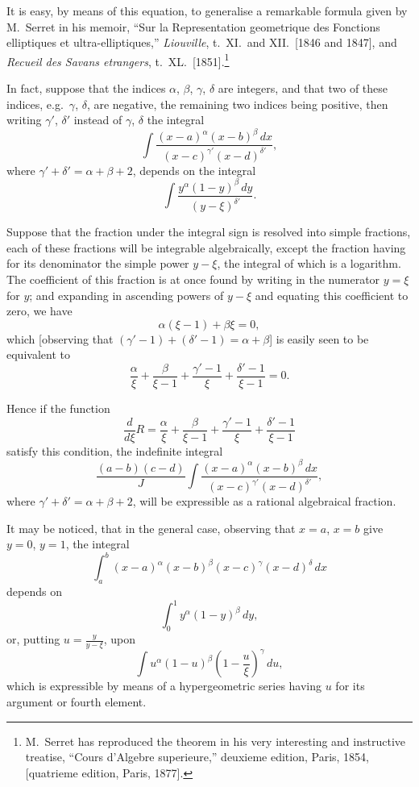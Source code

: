 \documentclass[12pt,a4paper]{article}
\theoremstyle{plain}
\begin{document}
It is easy, by means of this equation, to generalise a remarkable formula given by M.~Serret in his memoir, ``Sur la Representation geometrique des Fonctions elliptiques et ultra-elliptiques,'' \textit{Liouville}, t.~XI.\ and XII.\ [1846 and 1847], and \textit{Recueil des Savans etrangers}, t.~XL.\ [1851].\footnote{M.~Serret has reproduced the theorem in his very interesting and instructive treatise, ``Cours d'Algebre superieure,'' deuxieme edition, Paris, 1854, [quatrieme edition, Paris, 1877].}

In fact, suppose that the indices $\alpha$, $\beta$, $\gamma$, $\delta$ are integers, and that two of these indices, e.g.\ $\gamma$, $\delta$, are negative, the remaining two indices being positive, then writing $\gamma'$, $\delta'$ instead of $\gamma$, $\delta$ the integral
\[
\int \frac{(x-a)^\alpha (x-b)^\beta \, dx}{(x-c)^{\gamma'} (x-d)^{\delta'}},
\]
where $\gamma' + \delta' = \alpha + \beta + 2$, depends on the integral
\[
\int \frac{y^\alpha (1-y)^\beta \, dy}{(y-\xi)^{\delta'}}.
\]

Suppose that the fraction under the integral sign is resolved into simple fractions, each of these fractions will be integrable algebraically, except the fraction having for its denominator the simple power $y-\xi$, the integral of which is a logarithm. The coefficient of this fraction is at once found by writing in the numerator $y = \xi$ for $y$; and expanding in ascending powers of $y-\xi$ and equating this coefficient to zero, we have
\[
\alpha(\xi-1) + \beta\xi = 0,
\]
which [observing that $(\gamma'-1) + (\delta'-1) = \alpha + \beta$] is easily seen to be equivalent to
\[
\frac{\alpha}{\xi} + \frac{\beta}{\xi-1} + \frac{\gamma'-1}{\xi} + \frac{\delta'-1}{\xi-1} = 0.
\]

Hence if the function
\[
\frac{d}{d\xi} R = \frac{\alpha}{\xi} + \frac{\beta}{\xi-1} + \frac{\gamma'-1}{\xi} + \frac{\delta'-1}{\xi-1}
\]
satisfy this condition, the indefinite integral
\[
\frac{(a-b)(c-d)}{J} \int \frac{(x-a)^\alpha (x-b)^\beta \, dx}{(x-c)^{\gamma'} (x-d)^{\delta'}},
\]
where $\gamma' + \delta' = \alpha + \beta + 2$, will be expressible as a rational algebraical fraction.

It may be noticed, that in the general case, observing that $x=a$, $x=b$ give $y=0$, $y=1$, the integral
\[
\int_a^b (x-a)^\alpha (x-b)^\beta (x-c)^\gamma (x-d)^\delta \, dx
\]
depends on
\[
\int_0^1 y^\alpha (1-y)^\beta \, dy,
\]
or, putting $u = \frac{y}{y-\xi}$, upon
\[
\int u^\alpha (1-u)^\beta \left(1 - \frac{u}{\xi}\right)^\gamma \, du,
\]
which is expressible by means of a hypergeometric series having $u$ for its argument or fourth element.
\end{document}
